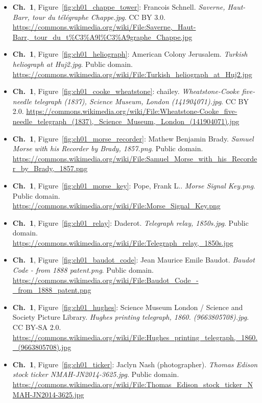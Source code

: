 \begin{small}\begin{itemize}[leftmargin=0pt,itemsep=2pt,label={}]
\item \textbf{Ch.~1}, Figure~\ref{fig:ch01_chappe_tower}: Francois Schnell. \emph{Saverne, Haut-\allowbreak{}Barr, tour du télégraphe Chappe.\allowbreak{}jpg}. CC BY 3.0. \url{https://commons.wikimedia.org/wiki/File:Saverne,_Haut-Barr,_tour_du_t%C3%A9l%C3%A9graphe_Chappe.jpg}
\item \textbf{Ch.~1}, Figure~\ref{fig:ch01_heliograph}: American Colony Jerusalem. \emph{Turkish heliograph at Huj2.\allowbreak{}jpg}. Public domain. \url{https://commons.wikimedia.org/wiki/File:Turkish_heliograph_at_Huj2.jpg}
\item \textbf{Ch.~1}, Figure~\ref{fig:ch01_cooke_wheatstone}: chailey. \emph{Wheatstone-\allowbreak{}Cooke five-\allowbreak{}needle telegraph (1837), Science Museum, London (141904071).\allowbreak{}jpg}. CC BY 2.0. \url{https://commons.wikimedia.org/wiki/File:Wheatstone-Cooke_five-needle_telegraph_(1837),_Science_Museum,_London_(141904071).jpg}
\item \textbf{Ch.~1}, Figure~\ref{fig:ch01_morse_recorder}: Mathew Benjamin Brady. \emph{Samuel Morse with his Recorder by Brady, 1857.\allowbreak{}png}. Public domain. \url{https://commons.wikimedia.org/wiki/File:Samuel_Morse_with_his_Recorder_by_Brady,_1857.png}
\item \textbf{Ch.~1}, Figure~\ref{fig:ch01_morse_key}: Pope, Frank L.. \emph{Morse Signal Key.\allowbreak{}png}. Public domain. \url{https://commons.wikimedia.org/wiki/File:Morse_Signal_Key.png}
\item \textbf{Ch.~1}, Figure~\ref{fig:ch01_relay}: Daderot. \emph{Telegraph relay, 1850s.\allowbreak{}jpg}. Public domain. \url{https://commons.wikimedia.org/wiki/File:Telegraph_relay,_1850s.jpg}
\item \textbf{Ch.~1}, Figure~\ref{fig:ch01_baudot_code}: Jean Maurice Emile Baudot. \emph{Baudot Code -\allowbreak{} from 1888 patent.\allowbreak{}png}. Public domain. \url{https://commons.wikimedia.org/wiki/File:Baudot_Code_-_from_1888_patent.png}
\item \textbf{Ch.~1}, Figure~\ref{fig:ch01_hughes}: Science Museum London / Science and Society Picture Library. \emph{Hughes printing telegraph, 1860.\allowbreak{} (9663805708).\allowbreak{}jpg}. CC BY-SA 2.0. \url{https://commons.wikimedia.org/wiki/File:Hughes_printing_telegraph,_1860._(9663805708).jpg}
\item \textbf{Ch.~1}, Figure~\ref{fig:ch01_ticker}: Jaclyn Nash (photographer). \emph{Thomas Edison stock ticker NMAH-\allowbreak{}JN2014-\allowbreak{}3625.\allowbreak{}jpg}. Public domain. \url{https://commons.wikimedia.org/wiki/File:Thomas_Edison_stock_ticker_NMAH-JN2014-3625.jpg}

\end{itemize}
\end{small}
